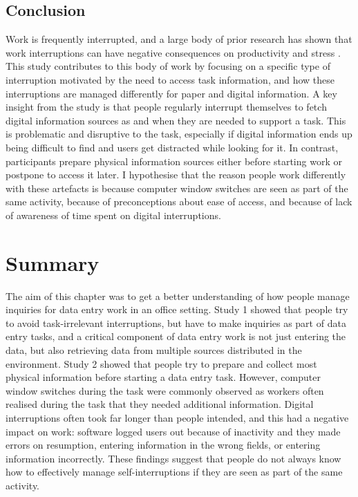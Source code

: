 \subsection{Conclusion}
Work is frequently interrupted, and a large body of prior research has shown that work interruptions can have negative consequences on productivity and stress \citep{Mark2008}. This study contributes to this body of work by focusing on a specific type of interruption motivated by the need to access task information, and how these interruptions are managed differently for paper and digital information. A key insight from the study is that people regularly interrupt themselves to fetch digital information sources as and when they are needed to support a task. This is problematic and disruptive to the task, especially if digital information ends up being difficult to find and users get distracted while looking for it. In contrast, participants prepare physical information sources either before starting work or postpone to access it later. I hypothesise that the reason people work differently with these artefacts is because computer window switches are seen as part of the same activity, because of preconceptions about ease of access, and because of lack of awareness of time spent on digital interruptions. 

\section{Summary}
The aim of this chapter was to get a better understanding of how people manage inquiries for data entry work in an office setting. Study 1 showed that people try to avoid task-irrelevant interruptions, but have to make inquiries as part of data entry tasks, and a critical component of data entry work is not just entering the data, but also retrieving data from multiple sources distributed in the environment. Study 2 showed that people try to prepare and collect most physical information before starting a data entry task. However, computer window switches during the task were commonly observed as workers often realised during the task that they needed additional information. Digital interruptions often took far longer than people intended, and this had a negative impact on work: software logged users out because of inactivity and they made errors on resumption, entering information in the wrong fields, or entering information incorrectly. These findings suggest that people do not always know how to effectively manage self-interruptions if they are seen as part of the same activity. 

